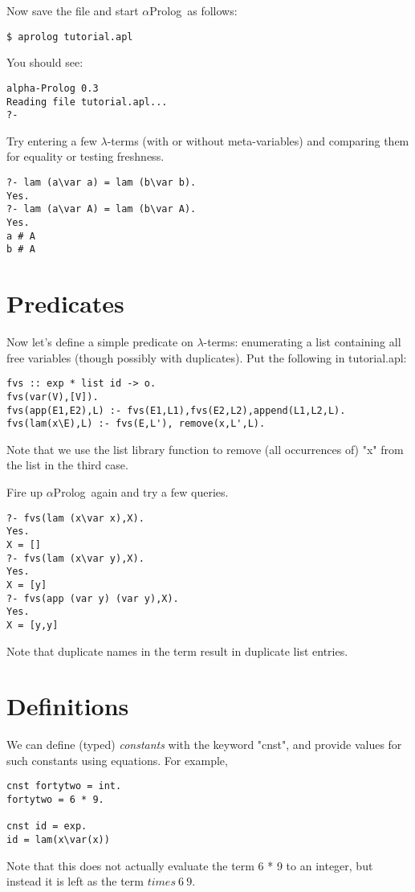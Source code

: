 \documentclass[draft,12pt]{report}
\newcommand{\aprolog}{$\alpha${Prolog}\xspace}
\begin{document}
Now save the file and start \aprolog\ as follows:

\begin{verbatim}
$ aprolog tutorial.apl
\end{verbatim}%
You should see:
\begin{verbatim}
alpha-Prolog 0.3
Reading file tutorial.apl...
?-
\end{verbatim}
Try entering a few $\lambda$-terms (with or without meta-variables)
and comparing them for equality or testing freshness.
\begin{verbatim}
?- lam (a\var a) = lam (b\var b).
Yes.
?- lam (a\var A) = lam (b\var A).
Yes.
a # A
b # A
\end{verbatim}

\section{Predicates}

Now let's define a simple predicate on $\lambda$-terms: enumerating a
list containing all free variables (though possibly with duplicates).
Put the following in tutorial.apl:
\begin{verbatim}
fvs :: exp * list id -> o.
fvs(var(V),[V]).
fvs(app(E1,E2),L) :- fvs(E1,L1),fvs(E2,L2),append(L1,L2,L).
fvs(lam(x\E),L) :- fvs(E,L'), remove(x,L',L).
\end{verbatim}
Note that we use the list library function to remove (all occurrences
of) "x" from the list in the third case.

Fire up \aprolog\ again and try a few queries.
\begin{verbatim}
?- fvs(lam (x\var x),X).
Yes.
X = [] 
?- fvs(lam (x\var y),X).
Yes.
X = [y] 
?- fvs(app (var y) (var y),X).
Yes.
X = [y,y] 
\end{verbatim}
Note that duplicate names in the term result in duplicate list
entries.

\section{Definitions}

We can define (typed) \emph{constants} with the keyword "cnst", and provide values for such constants using equations.  For example,
\begin{verbatim}
cnst fortytwo = int.
fortytwo = 6 * 9.

cnst id = exp.
id = lam(x\var(x))
\end{verbatim}
Note that this does not actually evaluate the term 6 * 9 to an integer,
but instead it is left as the term $times~6~9$.
\end{document}
